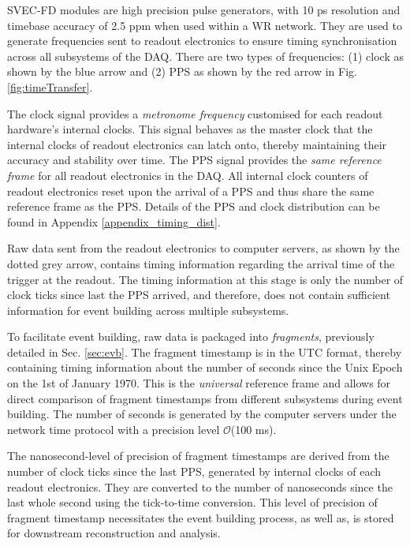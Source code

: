 SVEC-FD modules are high precision pulse generators, with 10 ps resolution and timebase accuracy of 2.5 ppm when used within a WR network.
They are used to generate frequencies sent to readout electronics to ensure timing synchronisation across all subsystems of the DAQ.
There are two types of frequencies: (1) clock as shown by the blue arrow and (2) PPS as shown by the red arrow in Fig. \ref{fig:timeTransfer}.

The clock signal provides a \textit{metronome frequency} customised for each readout hardware's internal clocks.
This signal behaves as the master clock that the internal clocks of readout electronics can latch onto, thereby maintaining their accuracy and stability over time.
The PPS signal provides the \textit{same reference frame} for all readout electronics in the DAQ.
All internal clock counters of readout electronics reset upon the arrival of a PPS and thus share the same reference frame as the PPS.
Details of the PPS and clock distribution can be found in Appendix \ref{appendix_timing_dist}.

Raw data sent from the readout electronics to computer servers, as shown by the dotted grey arrow, contains timing information regarding the arrival time of the trigger at the readout.
The timing information at this stage is only the number of clock ticks since last the PPS arrived, and therefore, does not contain sufficient information for event building across multiple subsystems.

To facilitate event building, raw data is packaged into \textit{fragments}, previously detailed in Sec. \ref{sec:evb}.
The fragment timestamp is in the UTC format, thereby containing timing information about the number of seconds since the Unix Epoch on the 1st of January 1970.
This is the \textit{universal} reference frame and allows for direct comparison of fragment timestamps from different subsystems during event building.
The number of seconds is generated by the computer servers under the network time protocol with a precision level $\mathcal{O}$(100 ms).

The nanosecond-level of precision of fragment timestamps are derived from the number of clock ticks since the last PPS, generated by internal clocks of each readout electronics.
They are converted to the number of nanoseconds since the last whole second using the tick-to-time conversion.
This level of precision of fragment timestamp necessitates the event building process, as well as, is stored for downstream reconstruction and analysis.

